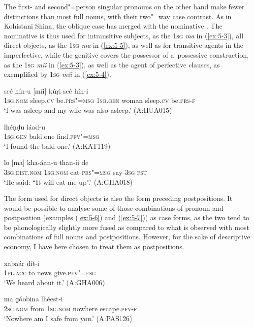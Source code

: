 The first- and second"=person singular pronouns on the other hand make fewer distinctions than most full nouns, with their two"=way case contrast. As in Kohistani Shina, the oblique case has merged with the nominative \citep[82]{schmidtkohistani2008}. The nominative is thus used for intransitive subjects, as the \textsc{1sg} \textit{ma} in (\ref{ex:5-3}), all direct objects, as the \textsc{1sg} \textit{ma} in (\ref{ex:5-5}), as well as for transitive agents in the imperfective, while the genitive covers the possessor of a~possessive construction, as the \textsc{1sg} \textit{míi} in (\ref{ex:5-3}), as well as the agent of perfective clauses, as exemplified by \textsc{1sg} \textit{míi} in (\ref{ex:5-4}). 


\begin{exe}
\ex
\label{ex:5-3}
\gll [ma] seé hín-u [míi] kúṛi seé hín-i \\
	\textsc{1sg.nom} sleep.\textsc{cv} be.\textsc{prs"=msg} \textsc{1sg.gen} woman sleep.\textsc{cv} be.\textsc{prs-f} \\
\glt `I was asleep and my wife was also asleep.' (A:HUA015)

\ex
\label{ex:5-4}
\gll [míi] lhéṇḍu láad-u \\
	\textsc{1sg.gen} bald.one find.\textsc{pfv"=msg} \\
\glt `I found the bald one.' (A:KAT119)

\ex
\label{ex:5-5}
\gll lo [ma] kha-áan-u than-íi de \\
	\textsc{3sg.dist.nom} \textsc{1sg.nom} eat-\textsc{prs"=msg} say-\textsc{3sg} \textsc{pst} \\
\glt `He said: ``It will eat me up''.' (A:GHA018)
\end{exe}

The form used for direct objects is also the form preceding postpositions. It would be possible to analyse some of those combinations of pronoun and postposition (examples (\ref{ex:5-6}) and (\ref{ex:5-7})) as case forms, as the two tend to be phonologically slightly more fused as compared to what is observed with most combinations of full nouns and postpositions. However, for the sake of descriptive economy, I have here chosen to treat them as postpositions. 

\begin{exe}
\ex
\label{ex:5-6}
 xabaár dít-i \\
	1\textsc{pl}.\textsc{acc} to news give.\textsc{pfv"=fsg} \\
\glt `We heard about it.' (A:GHA006)

\ex
\label{ex:5-7}
\gll [tu díi] ma ɡóobina lhéest-i \\
\textsc{2sg.nom} from \textsc{1sg.nom} nowhere escape.\textsc{pfv-f} \\
\glt `Nowhere am I safe from you.' (A:PAS126)
\end{exe}

